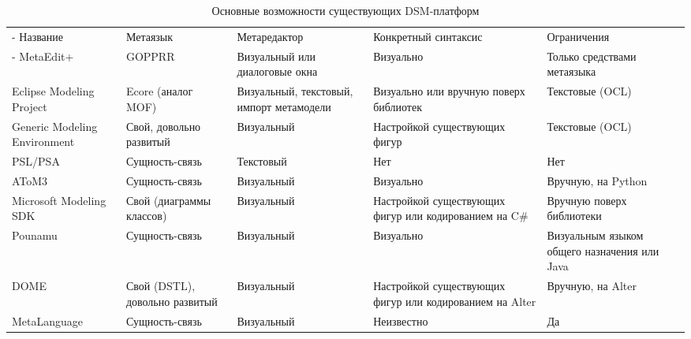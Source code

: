 \begin{table}[!ht]
\begin{small}
	\begin{longtabu} {| X[1 l p] | X[1 l p] | X[1 l p] | X[1 l p] |X[1 l p] |}
		\caption{Основные возможности существующих DSM-платформ} \\
		\tabucline-
		 Название                    & Метаязык                        & Метаредактор                                            & Конкретный синтаксис                                     & Ограничения                                    \\
		\tabucline-
		\everyrow{\tabucline-}
		MetaEdit+                    & GOPPRR                          & Визуальный или диалоговые окна                          & Визуально                                                & Только средствами метаязыка                    \\
		Eclipse Modeling Project     & Ecore (аналог MOF)              & Визуальный, текстовый, импорт метамодели                & Визуально или вручную поверх библиотек                   & Текстовые (OCL)                                \\
		Generic Modeling Environment & Свой, довольно развитый         & Визуальный                                              & Настройкой существующих фигур                            & Текстовые (OCL)                                \\
		PSL/PSA                      & Сущность-связь                  & Текстовый                                               & Нет                                                      & Нет                                            \\
		AToM3                        & Сущность-связь                  & Визуальный                                              & Визуально                                                & Вручную, на Python                             \\
		Microsoft Modeling SDK       & Свой (диаграммы классов)        & Визуальный                                              & Настройкой существующих фигур или кодированием на C\#    & Вручную поверх библиотеки                      \\
		Pounamu                      & Сущность-связь                  & Визуальный                                              & Визуально                                                & Визуальным языком общего назначения или Java   \\
		DOME                         & Свой (DSTL), довольно развитый  & Визуальный                                              & Настройкой существующих фигур или кодированием на Alter  & Вручную, на Alter                              \\
		MetaLanguage                 & Сущность-связь                  & Визуальный                                              & Неизвестно                                               & Да                                             
		\label{tab:existingPlatformsMain}
	\end{longtabu}
\end{small}
\end{table}

